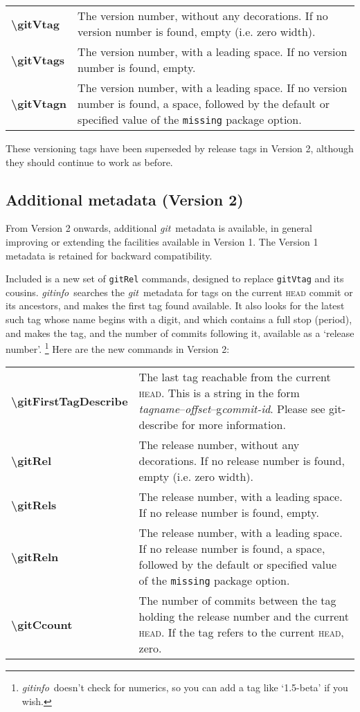 \documentclass[a4paper,12pt,twoside,openany]{memoir}
\newcommand{\sfit}[1]{\textit{#1}}
\newcommand{\git}{\sfit{git}}
\newcommand{\tpname}{\sfit{gitinfo}}
\begin{document}
\noindent
\begin{tabularx}{\textwidth}{@{}>{\ttfamily\bfseries\textbackslash}lX@{}}
gitVtag&
    The version number, without any decorations. If no version number is found,
    empty (i.e. zero width).
\\
gitVtags&
    The version number, with a leading space. If no version number is found,
    empty.
\\
gitVtagn&
    The version number, with a leading space.
    If no version number is found, a space,
    followed by the default or specified value of
    the \texttt{missing} package option.
\\
\end{tabularx}

These versioning tags have been superseded by release tags in Version 2, 
although they should continue to work as before.  

\subsection{Additional metadata (Version 2)}

From Version 2 onwards, additional \git\ metadata is available, 
in general improving or extending the facilities available in Version 1.
The Version 1 metadata is retained for backward compatibility.

Included is a new set of \texttt{gitRel} commands, 
designed to replace \texttt{gitVtag} and its cousins. 
\tpname\ searches the \git\ metadata for tags 
on the current \textsc{head} commit or its ancestors, 
and makes the first tag found available. 
It also looks for the latest such tag 
whose name begins with a digit, and which contains a full stop (period), 
and makes the tag, and the number of commits following it, 
available as a `release number'.%
\footnote{\tpname\ doesn't check for numerics, so you can add a tag like `1.5-beta' if you wish.} 
Here are the new commands in Version 2:
\vspace{0.5\baselineskip}

\noindent
\begin{tabularx}{\textwidth}{@{}>{\ttfamily\bfseries\textbackslash}lX@{}}gitFirstTagDescribe&
	The last tag reachable from the current \textsc{head}.
    This is a string in the form
    \textit{tagname}--\textit{offset}--g\textit{commit-id}.
    Please see git-describe for more information.
\\
gitRel&
    The release number, without any decorations.
    If no release number is found, empty (i.e. zero width).
\\
gitRels&
    The release number, with a leading space. 
    If no release number is found, empty.
\\
gitReln&
    The release number, with a leading space.
    If no release number is found, a space,
    followed by the default or specified value of
    the \texttt{missing} package option.
\\
gitCcount&
    The number of commits between the tag holding the release number
    and the current \textsc{head}.
    If the tag refers to the current \textsc{head}, zero.
\\
\end{tabularx}
\end{document}
